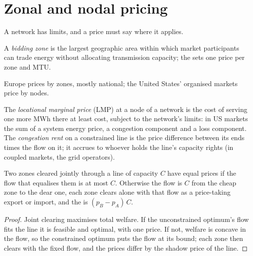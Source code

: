 \section{Zonal and nodal pricing}

A network has limits, and a price must say where it applies.

\begin{definition}\label{def:m3:power-markets-design:zone}
A \emph{bidding zone} is the largest geographic area within which
market participants can trade energy without allocating transmission capacity; the
 sets one price per zone and MTU.
\end{definition}

Europe prices by zones, mostly national; the United States' organised markets price by
nodes.

\begin{definition}\label{def:m3:power-markets-design:lmp}
The \emph{locational marginal price} (LMP) at a node of a
network is the cost of serving one more MWh there at least cost, subject to the network's
limits: in US markets the sum of a system energy price, a congestion component and a loss
component. The \emph{congestion rent} on a constrained line is the
price difference between its ends times the flow on it; it accrues to whoever holds the
line's capacity rights (in coupled markets, the grid operators).
\end{definition}

\begin{proposition}\label{prop:m3:power-markets-design:twozones}
Two zones cleared jointly through a line of capacity $C$ have equal prices if the flow
that equalises them is at most $C$. Otherwise the flow is $C$ from the cheap zone to the
dear one, each zone clears alone with that flow as a price-taking export or import, and
the  is $(p_B - p_A)\,C$.
\end{proposition}

\begin{proof}
Joint clearing maximises total welfare. If the unconstrained optimum's flow fits the line
it is feasible and optimal, with one price. If not, welfare is concave in the flow, so the
constrained optimum puts the flow at its bound; each zone then clears with the fixed flow,
and the prices differ by the shadow price of the line.
\end{proof}


